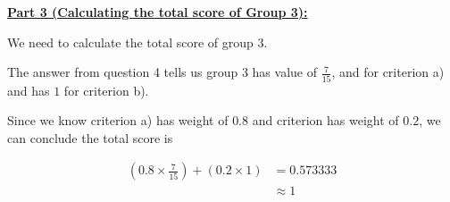 \documentclass[12pt]{article}
\begin{document}
\begin{itemize}
    \underline{\textbf{Part 3 (Calculating the total score of Group 3):}}

    \bigskip

    We need to calculate the total score of group 3.

    \bigskip

    The answer from question 4 tells us group 3 has value of $\frac{7}{15}$, and
    for criterion a) and has $1$ for criterion b).

    \bigskip

    Since we know criterion a) has weight of $0.8$ and criterion has weight of $0.2$,
    we can conclude the total score is

    \begin{align}
        (0.8 \times \frac{7}{15}) + (0.2 \times 1 ) &= 0.573333\\
        &\approx 1
    \end{align}

\end{itemize}

\bigskip
\end{document}

